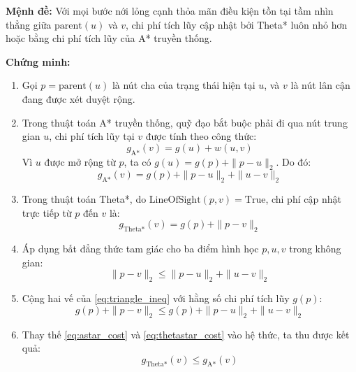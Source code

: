 \documentclass[a4paper, 12pt]{report}
\begin{document}
  \noindent\textbf{Mệnh đề:} Với mọi bước nới lỏng cạnh thỏa mãn điều kiện tồn tại tầm nhìn thẳng giữa $\text{parent}(u)$ và $v$, chi phí tích lũy cập nhật bởi Theta* luôn nhỏ hơn hoặc bằng chi phí tích lũy của A* truyền thống.

  \noindent\textbf{Chứng minh:}
  \begin{enumerate}
      \item Gọi $p = \text{parent}(u)$ là nút cha của trạng thái hiện tại $u$, và $v$ là nút lân cận đang được xét duyệt rộng.
      \item Trong thuật toán A* truyền thống, quỹ đạo bắt buộc phải đi qua nút trung gian $u$, chi phí tích lũy tại $v$ được tính theo công thức:
      \begin{equation}
      g_{\text{A*}}(v) = g(u) + w(u, v)
      \end{equation}
      Vì $u$ được mở rộng từ $p$, ta có $g(u) = g(p) + \|p - u\|_2$. Do đó:
      \begin{equation}\label{eq:astar_cost}
      g_{\text{A*}}(v) = g(p) + \|p - u\|_2 + \|u - v\|_2
      \end{equation}
      
      \item Trong thuật toán Theta*, do $\text{LineOfSight}(p, v) = \text{True}$, chi phí cập nhật trực tiếp từ $p$ đến $v$ là:
      \begin{equation}\label{eq:thetastar_cost}
      g_{\text{Theta*}}(v) = g(p) + \|p - v\|_2
      \end{equation}
      
      \item Áp dụng bất đẳng thức tam giác cho ba điểm hình học $p, u, v$ trong không gian:
      \begin{equation}\label{eq:triangle_ineq}
      \|p - v\|_2 \leq \|p - u\|_2 + \|u - v\|_2
      \end{equation}
      
      \item Cộng hai vế của \eqref{eq:triangle_ineq} với hằng số chi phí tích lũy $g(p)$:
      \begin{equation}
      g(p) + \|p - v\|_2 \leq g(p) + \|p - u\|_2 + \|u - v\|_2
      \end{equation}
      
      \item Thay thế \eqref{eq:astar_cost} và \eqref{eq:thetastar_cost} vào hệ thức, ta thu được kết quả:
      \begin{equation}
      g_{\text{Theta*}}(v) \leq g_{\text{A*}}(v)
      \end{equation}
  \end{enumerate}
\end{document}
